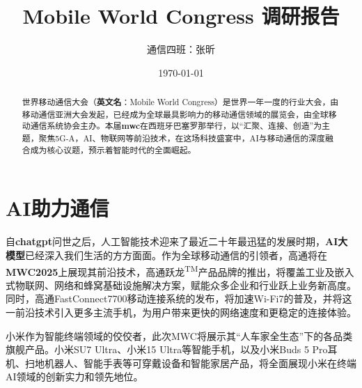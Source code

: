 \documentclass{article}
\title{\zihao{2} \heiti \textbf{Mobile World Congress} 调研报告}
\author{通信四班：张昕}
\date{\today}
\begin{document}
\maketitle
\begin{abstract}
{
世界移动通信大会（\textbf{英文名}：Mobile World Congress）是世界一年一度的行业大会，由移动通信亚洲大会发起，已经成为全球最具影响力的移动通信领域的展览会，由全球移动通信系统协会主办。本届\textbf{mwc}在西班牙巴塞罗那举行，以“汇聚、连接、创造”为主题，聚焦5G-A，AI、物联网等前沿技术，在这场科技盛宴中，AI与移动通信的深度融合成为核心议题，预示着智能时代的全面崛起。}
\end{abstract}
\section*{AI助力通信}
\indent 自\textbf{chatgpt}问世之后，人工智能技术迎来了最近二十年最迅猛的发展时期，\textbf{AI大模型}已经深入我们生活的方方面面。作为全球移动通信的引领者，高通将在\textbf{MWC2025}上展现其前沿技术，高通跃龙\textsuperscript{TM}产品品牌的推出，将覆盖工业及嵌入式物联网、网络和蜂窝基础设施解决方案，赋能众多企业和行业跃上业务新高度。同时，高通FastConnect7700移动连接系统的发布，将加速Wi-Fi7的普及，并将这一前沿技术引入更多主流手机，为用户带来更快的网络速度和更稳定的连接体验。\par
小米作为智能终端领域的佼佼者，此次MWC将展示其“人车家全生态”下的各品类旗舰产品。小米SU7 Ultra、小米15 Ultra等智能手机，以及小米Buds 5 Pro耳机、扫地机器人、智能手表等可穿戴设备和智能家居产品，将全面展现小米在终端AI领域的创新实力和领先地位。\par
\end{document}
